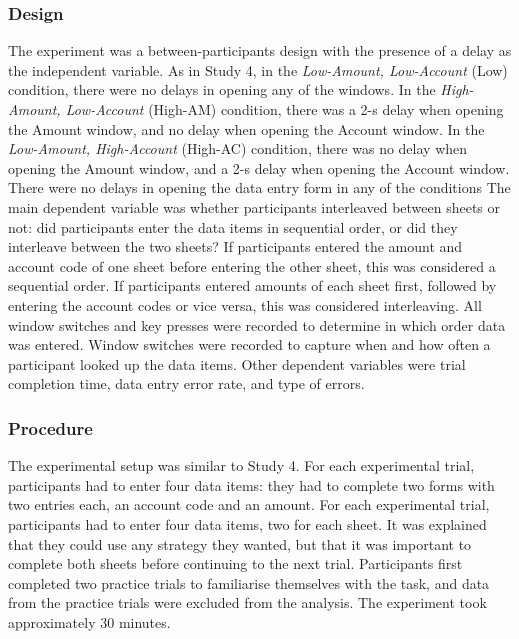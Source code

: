 \subsubsection{Design}
The experiment was a between-participants design with the presence of a delay as the independent variable. 
As in Study 4, in the \textit{Low-Amount, Low-Account} (Low) condition, there were no delays in opening any of the windows. In the \textit{High-Amount, Low-Account} (High-AM) condition, there was a 2-s delay when opening the Amount window, and no delay when opening the Account window. In the \textit{Low-Amount, High-Account} (High-AC) condition, there was no delay when opening the Amount window, and a 2-s delay when opening the Account window. There were no delays in opening the data entry form in any of the conditions 
The main dependent variable was whether participants interleaved between sheets or not: did participants enter the data items in sequential order, or did they interleave between the two sheets? If participants entered the amount and account code of one sheet before entering the other sheet, this was considered a sequential order. If participants entered amounts of each sheet first, followed by entering the account codes or vice versa, this was considered interleaving. All window switches and key presses were recorded to determine in which order data was entered. Window switches were recorded to capture when and how often a participant looked up the data items. Other dependent variables were trial completion time, data entry error rate, and type of errors.


\subsubsection{Procedure}
The experimental setup was similar to Study 4. For each experimental trial, participants had to enter four data items: they had to complete two forms with two entries each, an account code and an amount. For each experimental trial, participants had to enter four data items, two for each sheet. It was explained that they could use any strategy they wanted, but that it was important to complete both sheets before continuing to the next trial. Participants first completed two practice trials to familiarise themselves with the task, and data from the practice trials were excluded from the analysis. The experiment took approximately 30 minutes.

